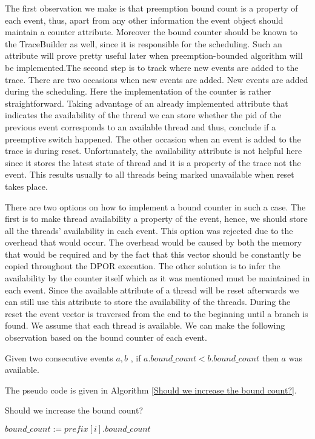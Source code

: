 The first observation we make is that preemption bound count is a property of each event, thus, apart from any other information the event object should
maintain a counter attribute. Moreover the bound counter should be known to the TraceBuilder as well, since it is responsible for the scheduling.
Such an attribute will prove pretty useful later when preemption-bounded algorithm will be implemented.The second step is to track where new events are added to the trace. There are two occasions when new events
are added. New events are added during the scheduling. Here the implementation of the counter is rather straightforward. 
Taking advantage of an already implemented attribute that indicates the availability of the thread we can store whether the pid of the previous event
corresponds to an available thread and thus, conclude if a preemptive switch happened.
The other occasion when an event is added to the trace is during reset. Unfortunately, the availability attribute is not helpful here since it stores
the latest state of thread and it is a property of the trace not the event. This results usually to all threads being marked unavailable when reset takes place.

There are two options on how to implement a bound counter in such a case. The first is to make thread availability a property of the event, hence, we should store
all the threads' availability in each event. This option was rejected due to the overhead that would occur. The overhead would be caused by both the
memory that would be required and by the fact that this vector should be constantly be copied throughout the DPOR execution. 
The other solution is to infer the availability by the counter itself which as it was mentioned must be maintained in each event. Since the available attribute of
a thread will be reset afterwards we can still use this attribute to store the availability of the threads. 
During the reset the event vector is traversed from the end to the beginning until a branch is found. We assume that each thread is available.
We can make the following observation based on the bound counter of each event.

Given two consecutive events $a,b$ , if $a.bound\_count < b.bound\_count$ then $a$ was available.

The pseudo code is given in Algorithm \ref{Should we increase the bound count?}.

\begin{algorithm}
    \caption{Should we increase the bound count?}
    \label{Should we increase the bound count?}
    $bound\_count := prefix[i].bound\_count$  \;

\end{algorithm}


